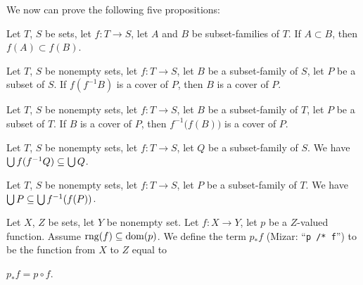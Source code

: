 \documentclass{article}
\begin{document}
We now can prove the following five propositions:
\begin{thm}
\item\label{funct2:103} Let $T$, $S$ be sets, let $f\colon T\to S$,
  let $A$ and $B$ be subset-families of $T$. If $A\subset B$,
  then $f(A)\subset f(B)$.
\item\label{funct2:104} Let $T$, $S$ be nonempty sets, let $f\colon T\to S$,
  let $B$ be a subset-family of $S$, let $P$ be a subset of $S$.
  If $f(f^{-1}B)$ is a cover of $P$, then $B$ is a cover of $P$.
\item\label{funct2:105} Let $T$, $S$ be nonempty sets, let $f\colon T\to S$,
  let $B$ be a subset-family of $T$, let $P$ be a subset of $T$.
  If $B$ is a cover of $P$, then $f^{-1}\bigl(f(B)\bigr)$ is a cover of $P$.
\item\label{funct2:106} Let $T$, $S$ be nonempty sets, let $f\colon T\to S$,
  let $Q$ be a subset-family of $S$. We have $\bigcup f(f^{-1}Q)\subseteq\bigcup Q$.
\item\label{funct2:107} Let $T$, $S$ be nonempty sets, let $f\colon T\to S$,
  let $P$ be a subset-family of $T$.
  We have $\bigcup P\subseteq\bigcup f^{-1}(f(P))$.
\end{thm}

\begin{definition}
Let $X$, $Z$ be sets, let $Y$ be nonempty set. Let $f\colon X\to Y$,
let $p$ be a $Z$-valued function. Assume $\operatorname{rng}(f)\subseteq\operatorname{dom}(p)$.
We define the term $p_{*}f$ (Mizar: ``\verb#p /* f#'') to be the function from $X$ to $Z$ equal to
\begin{defn}
\item $p_{*}f=p\circ f$.
\end{defn}
\end{definition}
\end{document}
